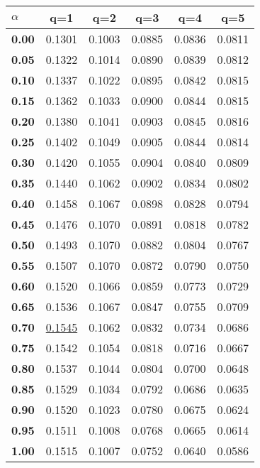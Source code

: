 \begin{tabular}{ | l || c | c | c | c | c |}
\hline
\textbf{$\alpha$} & \textbf{}q=1} & \textbf{}q=2} & \textbf{}q=3} & \textbf{}q=4} & \textbf{}q=5} \\
\hline
\textbf{0.00} & 0.1301 & 0.1003 & 0.0885 & 0.0836 & 0.0811\\
\hline
\textbf{0.05} & 0.1322 & 0.1014 & 0.0890 & 0.0839 & 0.0812\\
\hline
\textbf{0.10} & 0.1337 & 0.1022 & 0.0895 & 0.0842 & 0.0815\\
\hline
\textbf{0.15} & 0.1362 & 0.1033 & 0.0900 & 0.0844 & 0.0815\\
\hline
\textbf{0.20} & 0.1380 & 0.1041 & 0.0903 & 0.0845 & 0.0816\\
\hline
\textbf{0.25} & 0.1402 & 0.1049 & 0.0905 & 0.0844 & 0.0814\\
\hline
\textbf{0.30} & 0.1420 & 0.1055 & 0.0904 & 0.0840 & 0.0809\\
\hline
\textbf{0.35} & 0.1440 & 0.1062 & 0.0902 & 0.0834 & 0.0802\\
\hline
\textbf{0.40} & 0.1458 & 0.1067 & 0.0898 & 0.0828 & 0.0794\\
\hline
\textbf{0.45} & 0.1476 & 0.1070 & 0.0891 & 0.0818 & 0.0782\\
\hline
\textbf{0.50} & 0.1493 & 0.1070 & 0.0882 & 0.0804 & 0.0767\\
\hline
\textbf{0.55} & 0.1507 & 0.1070 & 0.0872 & 0.0790 & 0.0750\\
\hline
\textbf{0.60} & 0.1520 & 0.1066 & 0.0859 & 0.0773 & 0.0729\\
\hline
\textbf{0.65} & 0.1536 & 0.1067 & 0.0847 & 0.0755 & 0.0709\\
\hline
\textbf{0.70} & \underline{0.1545} & 0.1062 & 0.0832 & 0.0734 & 0.0686\\
\hline
\textbf{0.75} & 0.1542 & 0.1054 & 0.0818 & 0.0716 & 0.0667\\
\hline
\textbf{0.80} & 0.1537 & 0.1044 & 0.0804 & 0.0700 & 0.0648\\
\hline
\textbf{0.85} & 0.1529 & 0.1034 & 0.0792 & 0.0686 & 0.0635\\
\hline
\textbf{0.90} & 0.1520 & 0.1023 & 0.0780 & 0.0675 & 0.0624\\
\hline
\textbf{0.95} & 0.1511 & 0.1008 & 0.0768 & 0.0665 & 0.0614\\
\hline
\textbf{1.00} & 0.1515 & 0.1007 & 0.0752 & 0.0640 & 0.0586\\
\hline
\end{tabular}
